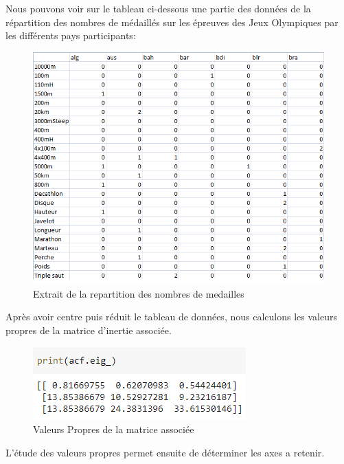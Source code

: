 \documentclass{article}
\begin{document}
Nous pouvons voir sur le tableau ci-dessous une partie des données de la répartition des nombres de médaillés sur les épreuves des Jeux Olympiques par les différents pays participants:

\begin{figure}[h!]
\centering
\includegraphics[scale=0.75]{images/Extrait.PNG}
\caption{Extrait de la repartition des nombres de medailles}
\end{figure}

Après avoir centre puis réduit le tableau de données, nous calculons les valeurs propres de la matrice d'inertie associée.

\begin{figure}[h!]
\centering
\includegraphics[scale=0.75]{images/VP.PNG}
\caption{Valeurs Propres de la matrice associée}
\end{figure}

\newpage

L'étude des valeurs propres permet ensuite de déterminer les axes a retenir.
\end{document}
